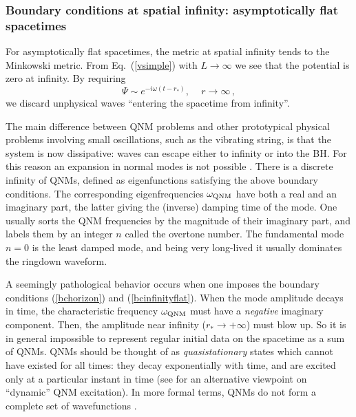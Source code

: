 \documentclass[]{iopart}
\def\be{\begin{equation}}
\def\ee{\end{equation}}
\begin{document}
\subsubsection*{Boundary conditions at spatial infinity: asymptotically flat spacetimes}

For asymptotically flat spacetimes, the metric at spatial infinity tends to
the Minkowski metric. From Eq.~(\ref{vsimple}) with $L\to \infty$ we see that
the potential is zero at infinity. By requiring
%
\be 
\Psi \sim e^{-i\omega (t-r_*)},\,\quad r\rightarrow \infty 
\label{bcinfinityflat}\,, 
\ee
%
we discard unphysical waves ``entering the spacetime from infinity''. 

The main difference between QNM problems and other prototypical physical
problems involving small oscillations, such as the vibrating string, is that
the system is now dissipative: waves can escape either to infinity or into the
BH. For this reason an expansion in normal modes is not possible
\cite{Kokkotas:1999bd,Nollert:1999ji,Leaver:1986gd,nollertschmidt}. There is a
discrete infinity of QNMs, defined as eigenfunctions satisfying the above
boundary conditions. The corresponding eigenfrequencies $\omega_{\rm QNM}$
have both a real and an imaginary part, the latter giving the (inverse)
damping time of the mode. One usually sorts the QNM frequencies by the
magnitude of their imaginary part, and labels them by an integer $n$ called
the overtone number. The fundamental mode $n=0$ is the least damped mode, and
being very long-lived it usually dominates the ringdown waveform.

A seemingly pathological behavior occurs when one imposes the boundary
conditions (\ref{bchorizon}) and (\ref{bcinfinityflat}). When the mode
amplitude decays in time, the characteristic frequency $\omega_{\rm QNM}$ must
have a {\it negative} imaginary component. Then, the amplitude near infinity
($r_*\rightarrow +\infty$) must blow up. So it is in general impossible to
represent regular initial data on the spacetime as a sum of QNMs. QNMs should
be thought of as {\it quasistationary} states which cannot have existed for
all times: they decay exponentially with time, and are excited only at a
particular instant in time (see \cite{Andersson:1996cm} for an alternative
viewpoint on ``dynamic'' QNM excitation). In more formal terms, QNMs do not
form a complete set of wavefunctions \cite{Nollert:1999ji}.

\end{document}
